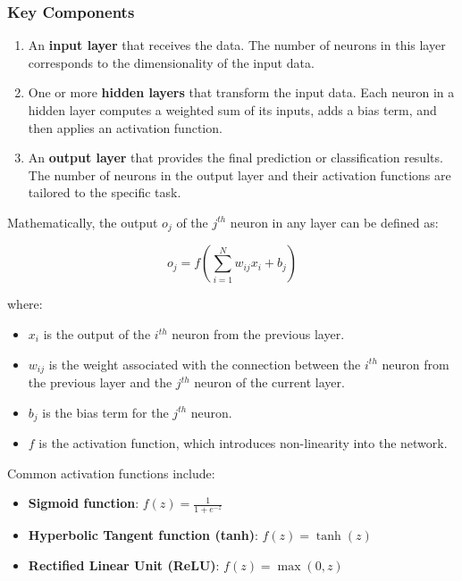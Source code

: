 \subsubsection{Key Components}

\begin{enumerate}
	\item An \textbf{input layer} that receives the data. The number of neurons in this layer corresponds to the dimensionality of the input data.
	
	\item One or more \textbf{hidden layers} that transform the input data. Each neuron in a hidden layer computes a weighted sum of its inputs, adds a bias term, and then applies an activation function.
	
	\item An \textbf{output layer} that provides the final prediction or classification results. The number of neurons in the output layer and their activation functions are tailored to the specific task.
\end{enumerate}

Mathematically, the output \( o_{j} \) of the \( j^{th} \) neuron in any layer can be defined as:

\[
o_{j} = f\left( \sum_{i=1}^{N} w_{ij} x_{i} + b_{j} \right)
\]

where:
\begin{itemize}
	\item \( x_{i} \) is the output of the \( i^{th} \) neuron from the previous layer.
	\item \( w_{ij} \) is the weight associated with the connection between the \( i^{th} \) neuron from the previous layer and the \( j^{th} \) neuron of the current layer.
	\item \( b_{j} \) is the bias term for the \( j^{th} \) neuron.
	\item \( f \) is the activation function, which introduces non-linearity into the network.
\end{itemize}

Common activation functions include:
\begin{itemize}
	\item \textbf{Sigmoid function}: \( f(z) = \frac{1}{1 + e^{-z}} \)
	\item \textbf{Hyperbolic Tangent function (tanh)}: \( f(z) = \tanh(z) \)
	\item \textbf{Rectified Linear Unit (ReLU)}: \( f(z) = \max(0, z) \)
\end{itemize}

